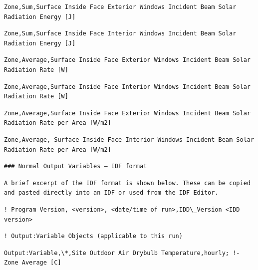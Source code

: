 \begin{lstlisting}
Zone,Sum,Surface Inside Face Exterior Windows Incident Beam Solar Radiation Energy [J]
\end{lstlisting}

\begin{lstlisting}
Zone,Sum,Surface Inside Face Interior Windows Incident Beam Solar Radiation Energy [J]
\end{lstlisting}

\begin{lstlisting}
Zone,Average,Surface Inside Face Exterior Windows Incident Beam Solar Radiation Rate [W]
\end{lstlisting}

\begin{lstlisting}
Zone,Average,Surface Inside Face Interior Windows Incident Beam Solar Radiation Rate [W]
\end{lstlisting}

\begin{lstlisting}
Zone,Average,Surface Inside Face Exterior Windows Incident Beam Solar Radiation Rate per Area [W/m2]
\end{lstlisting}

\begin{lstlisting}
Zone,Average, Surface Inside Face Interior Windows Incident Beam Solar Radiation Rate per Area [W/m2]
\end{lstlisting}

\begin{lstlisting}
### Normal Output Variables – IDF format
\end{lstlisting}

\begin{lstlisting}
A brief excerpt of the IDF format is shown below. These can be copied and pasted directly into an IDF or used from the IDF Editor.
\end{lstlisting}

\begin{lstlisting}
! Program Version, <version>, <date/time of run>,IDD\_Version <IDD version>
\end{lstlisting}

\begin{lstlisting}
! Output:Variable Objects (applicable to this run)
\end{lstlisting}

\begin{lstlisting}
Output:Variable,\*,Site Outdoor Air Drybulb Temperature,hourly; !- Zone Average [C]
\end{lstlisting}

